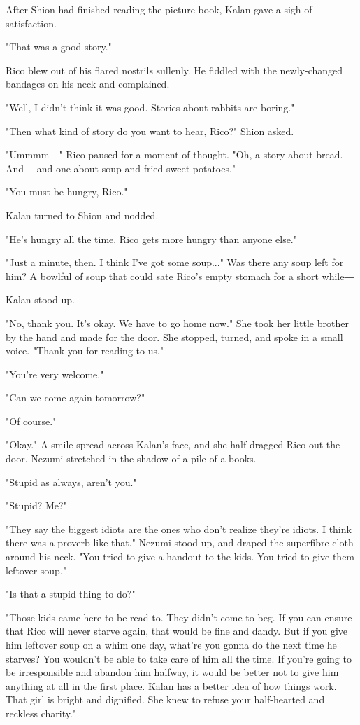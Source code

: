 After Shion had finished reading the picture book, Kalan gave a sigh of
satisfaction.

"That was a good story."

Rico blew out of his flared nostrils sullenly. He fiddled with the
newly-changed bandages on his neck and complained.

"Well, I didn't think it was good. Stories about rabbits are boring."

"Then what kind of story do you want to hear, Rico?" Shion asked.

"Ummmm―" Rico paused for a moment of thought. "Oh, a story about bread.
And― and one about soup and fried sweet potatoes."

"You must be hungry, Rico."

Kalan turned to Shion and nodded.

"He's hungry all the time. Rico gets more hungry than anyone else."

"Just a minute, then. I think I've got some soup..." Was there any soup
left for him? A bowlful of soup that could sate Rico's empty stomach for
a short while―

Kalan stood up.

"No, thank you. It's okay. We have to go home now." She took her little
brother by the hand and made for the door. She stopped, turned, and
spoke in a small voice. "Thank you for reading to us."

"You're very welcome."

"Can we come again tomorrow?"

"Of course."

"Okay." A smile spread across Kalan's face, and she half-dragged Rico
out the door. Nezumi stretched in the shadow of a pile of a books.

"Stupid as always, aren't you."

"Stupid? Me?"

"They say the biggest idiots are the ones who don't realize they're
idiots. I think there was a proverb like that." Nezumi stood up, and
draped the superfibre cloth around his neck. "You tried to give a
handout to the kids. You tried to give them leftover soup."

"Is that a stupid thing to do?"

"Those kids came here to be read to. They didn't come to beg. If you can
ensure that Rico will never starve again, that would be fine and dandy.
But if you give him leftover soup on a whim one day, what're you gonna
do the next time he starves? You wouldn't be able to take care of him
all the time. If you're going to be irresponsible and abandon him
halfway, it would be better not to give him anything at all in the first
place. Kalan has a better idea of how things work. That girl is bright
and dignified. She knew to refuse your half-hearted and reckless
charity."


